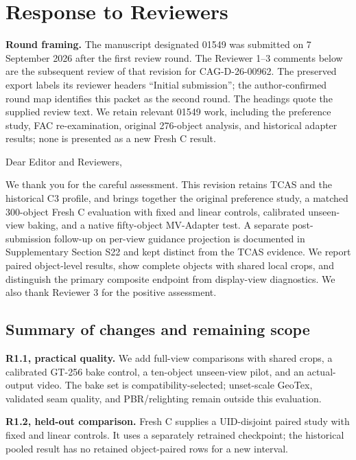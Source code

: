 \documentclass[
]{article}
\author{}
\date{}
\begin{document}
\hypertarget{response-to-reviewers}{%
\section{Response to Reviewers}\label{response-to-reviewers}}

\textbf{Round framing.} The manuscript designated 01549 was submitted on
7 September 2026 after the first review round. The Reviewer 1--3
comments below are the subsequent review of that revision for
CAG-D-26-00962. The preserved export labels its reviewer headers
``Initial submission''; the author-confirmed round map identifies this
packet as the second round. The headings quote the supplied review text.
We retain relevant 01549 work, including the preference study, FAC
re-examination, original 276-object analysis, and historical adapter
results; none is presented as a new Fresh C result.

Dear Editor and Reviewers,

We thank you for the careful assessment. This revision retains TCAS and
the historical C3 profile, and brings together the original preference
study, a matched 300-object Fresh C evaluation with fixed and linear
controls, calibrated unseen-view baking, and a native fifty-object
MV-Adapter test. A separate post-submission follow-up on per-view
guidance projection is documented in Supplementary Section S22 and kept
distinct from the TCAS evidence. We report paired object-level results,
show complete objects with shared local crops, and distinguish the
primary composite endpoint from display-view diagnostics. We also thank
Reviewer 3 for the positive assessment.

\hypertarget{summary-of-changes-and-remaining-scope}{%
\subsection{Summary of changes and remaining
scope}\label{summary-of-changes-and-remaining-scope}}

\textbf{R1.1, practical quality.} We add full-view comparisons with
shared crops, a calibrated GT-256 bake control, a ten-object unseen-view
pilot, and an actual-output video. The bake set is
compatibility-selected; unset-scale GeoTex, validated seam quality, and
PBR/relighting remain outside this evaluation.

\textbf{R1.2, held-out comparison.} Fresh C supplies a UID-disjoint
paired study with fixed and linear controls. It uses a separately
retrained checkpoint; the historical pooled result has no retained
object-paired rows for a new interval.
\end{document}
